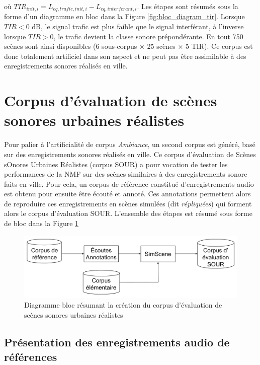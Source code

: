 où $TIR_{init,i} = L_{eq,trafic,init,i}-L_{eq,interferant,i}$. Les étapes sont résumés sous la forme d'un diagramme en bloc dans la Figure \ref{fig:bloc_diagram_tir}. Lorsque $TIR < 0$ dB, le signal trafic est plus faible que le signal interférant, à l'inverse lorsque $TIR>0$, le trafic devient la classe sonore prépondérante. En tout 750 scènes sont ainsi disponibles (6 sous-corpus $\times$ 25 scènes $\times$ 5 TIR). Ce corpus est donc totalement artificiel dans son aspect et ne peut pas être assimilable à des enregistrements sonores réalisés en ville. \\

\section{Corpus d'évaluation de scènes sonores urbaines réalistes}
\label{part:corpus_grafic}

Pour palier à l'artificialité de corpus \textit{Ambiance}, un second corpus est généré, basé sur des enregistrements sonores réalisés en ville. Ce corpus d'évaluation de Scènes sOnores Urbaines Réalistes (corpus SOUR) a pour vocation de tester les performances de la NMF sur des scènes similaires à des enregistrements sonore faits en ville. Pour cela, un corpus de référence constitué d'enregistrements audio est obtenu pour ensuite être écouté et annoté. Ces annotations permettent alors de reproduire ces enregistrements en scènes simulées (dit \textit{répliquées}) qui forment alors le corpus d'évaluation SOUR. L'ensemble des étapes est résumé sous forme de bloc dans la Figure \ref{fig:bloc_diagram_annotation}

\begin{figure}[ht]
\centering
\includegraphics[width=.7\textwidth]{./figures/autres/bloc_diagram_annotation.pdf}
\caption{Diagramme bloc résumant la création du corpus d'évaluation de scènes sonores urbaines réalistes}
\label{fig:bloc_diagram_annotation}
\end{figure}

\subsection{Présentation des enregistrements audio de références}

